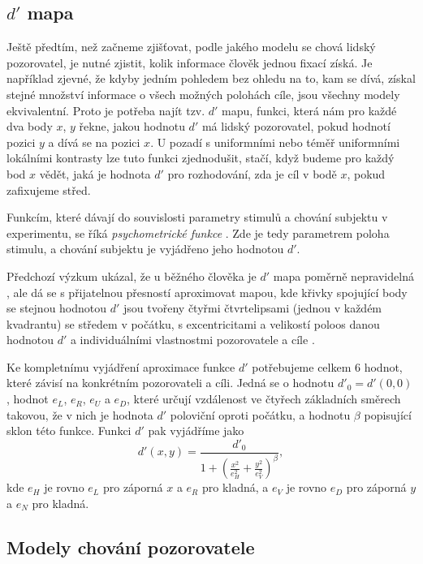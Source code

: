 \subsection{$d'$ mapa}

Ještě předtím, než začneme zjišťovat, podle jakého modelu se chová lidský
pozorovatel, je nutné zjistit, kolik informace člověk jednou fixací získá. Je
například zjevné, že kdyby jedním pohledem bez ohledu na to, kam se dívá,
získal stejné množství informace o všech možných polohách cíle, jsou všechny
modely ekvivalentní. Proto je potřeba najít tzv. $d'$ mapu, funkci, která nám
pro každé dva body $x$, $y$ řekne, jakou hodnotu $d'$ má lidský pozorovatel,
pokud hodnotí pozici $y$ a dívá se na pozici $x$. U pozadí s uniformními nebo
téměř uniformními lokálními kontrasty lze tuto funkci zjednodušit, stačí, když
budeme pro každý bod $x$ vědět, jaká je hodnota $d'$ pro rozhodování, zda je
cíl v bodě $x$, pokud zafixujeme střed.

Funkcím, které dávají do souvislosti parametry stimulů a chování subjektu v
experimentu, se říká {\it psychometrické funkce} \citep{psychophysics}. Zde je
tedy parametrem poloha stimulu, a chování subjektu je vyjádřeno jeho hodnotou
$d'$.

Předchozí výzkum ukázal, že u běžného člověka je $d'$ mapa poměrně
nepravidelná \citep{Najemnik08}, ale dá se s přijatelnou přesností aproximovat mapou, kde křivky
spojující body se stejnou hodnotou $d'$ jsou tvořeny čtyřmi čtvrtelipsami
(jednou v každém kvadrantu) se středem v počátku, s
excentricitami a velikostí poloos danou hodnotou $d'$ a individuálními
vlastnostmi pozorovatele a cíle \citep{Ellipse}. 

Ke kompletnímu vyjádření aproximace funkce $d'$ potřebujeme celkem 6 hodnot,
které závisí na konkrétním pozorovateli a cíli. Jedná se o hodnotu $d'_0 =
d'(0,0)$, hodnot $e_L$, $e_R$, $e_U$ a $e_D$, které určují vzdálenost ve čtyřech
základních směrech takovou, že v nich je hodnota $d'$ poloviční oproti počátku,
a hodnotu $\beta$ popisující sklon této funkce. Funkci $d'$ pak vyjádříme jako
$$ d'(x,y) = \frac{d'_0}{1+\left(\frac{x^2}{e_H^2}+\frac{y^2}{e_V^2}
\right)^\beta}, $$ kde $e_H$ je rovno $e_L$ pro záporná $x$ a $e_R$ pro kladná,
a $e_V$ je rovno $e_D$ pro záporná $y$ a $e_N$ pro kladná.


\subsection{Modely chování pozorovatele}

